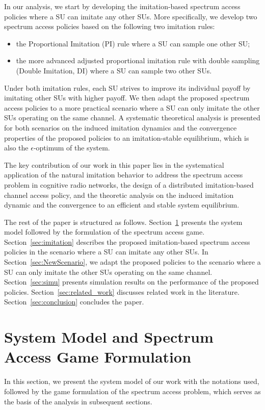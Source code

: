 \documentclass[12pt, onecolumn]{IEEEtran}
\theoremstyle{plain}
\theoremstyle{definition}
\begin{document}
In our analysis, we start by developing the imitation-based spectrum access policies where a SU can imitate any other SUs. More specifically, we develop two spectrum access policies based on the following two imitation rules:
\begin{itemize}
\item the Proportional Imitation (PI) rule where a SU can sample one other SU;
\item the more advanced adjusted proportional imitation rule with double sampling (Double Imitation, DI) where a SU can sample two other SUs.
\end{itemize}
Under both imitation rules, each SU strives to improve its individual payoff by imitating other SUs with higher payoff. We then adapt the proposed spectrum access policies to a more practical scenario where a SU can only imitate the other SUs operating on the same channel. A systematic theoretical analysis is presented for both scenarios on the induced imitation dynamics and the convergence properties of the proposed policies to an imitation-stable equilibrium, which is also the $\epsilon$-optimum of the system.

The key contribution of our work in this paper lies in the systematical application of the natural imitation behavior to address the spectrum access problem in cognitive radio networks, the design of a distributed imitation-based channel access policy, and the theoretic analysis on the induced imitation dynamic and the convergence to an efficient and stable system equilibrium.

The rest of the paper is structured as follows. Section~\ref{sec:models} presents the system model followed by the formulation of the spectrum access game. Section~\ref{sec:imitation} describes the proposed imitation-based spectrum access policies in the scenario where a SU can imitate any other SUs. In Section~\ref{sec:NewScenario}, we adapt the proposed policies to the scenario where a SU can only imitate the other SUs operating on the same channel. Section~\ref{sec:simu} presents simulation results on the performance of the proposed policies. Section~\ref{sec:related_work} discusses related work in the literature. Section~\ref{sec:conclusion} concludes the paper.

\section{System Model and Spectrum Access Game Formulation}
\label{sec:models}
In this section, we present the system model of our work with the notations used, followed by the game formulation of the spectrum access problem, which serves as the basis of the analysis in subsequent sections.
\end{document}

